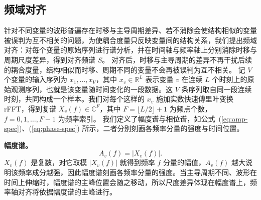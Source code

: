 \subsection{频域对齐}

针对不同变量的波形普遍存在时移与主导周期差异、若不消除会使结构相似的变量被误判为互不相关的问题，为使耦合度量只反映变量间的结构关系，我们提出频域对齐：对每个变量的原始序列进行谱分析，并在时间轴与频率轴上分别消除时移与周期尺度差异，得到对齐频谱 $S$。
对齐后，时移与主导周期的差异不再干扰后续的耦合度量，结构相似而时移、周期不同的变量不会再被误判为互不相关。
记 $V$ 个变量的输入序列为 $x_1,\dots,x_V$，其中 $x_v \in \mathbb{R}^L$ 表示变量 $v$ 在连续 $L$ 个时刻上的原始观测序列，也就是该变量随时间变化的一段数据。这 $V$ 条序列取自同一段连续时刻，共同构成一个样本。我们对每个这样的 $x_v$ 施加实数快速傅里叶变换 rFFT，得到复谱 $X_v(f) \in \mathbb{C}^F$，其中 $F = \lfloor L/2 \rfloor+1$ 为频点个数，$f = 0,1,\dots,F-1$ 为频率索引。
我们定义了幅度谱与相位谱，如公式~(\ref{eq:amp-spec})、(\ref{eq:phase-spec}) 所示，二者分别刻画各频率分量的强度与时间位置。

\textbf{幅度谱。}
\begin{equation}
\label{eq:amp-spec}
A_v(f) = |X_v(f)|.
\end{equation}
$X_v(f)$ 是复数，对它取模 $|X_v(f)|$ 就得到频率 $f$ 分量的幅值，$A_v(f)$ 越大说明该频率成分越强，因此幅度谱刻画各频率分量的强度。当主导周期不同、波形在时间上伸缩时，幅度谱的主峰位置会随之移动，所以尺度差异体现在幅度谱上，频率轴对齐将依据幅度谱的主峰进行。

